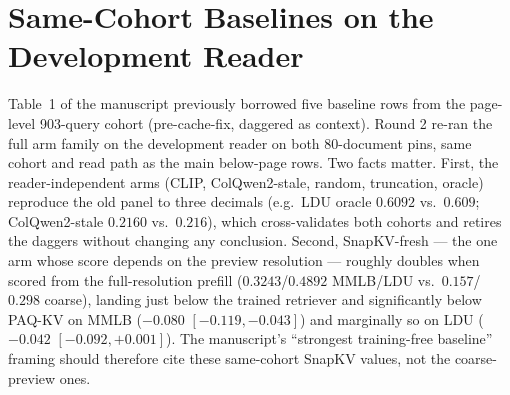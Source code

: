 \documentclass[letterpaper]{article} %
\newcommand{\paqc}{\textsc{PAQ-KV}}
\begin{document}
\begin{table}[t]
\centering\small
\setlength{\tabcolsep}{5pt}

\caption{Consolidated arm panel across all cells (accuracy at nominal $b{=}5\%$, reader Qwen3-VL-8B). LDU/MMLB baselines are the round-2 \emph{same-cohort} re-runs on the 80-document development pins (post-cache-fix, read path identical to the cached comparator rows); the reader-independent arms reproduce the earlier page-level panel to three decimals, while SnapKV-fresh is now scored from the full-resolution prefill attention (the same prefill \paqc{} uses) rather than the earlier coarse-render preview, which raises it substantially and is the fair same-cohort form. The sealed column reports the frozen sealed verdict's two arms only; its other cells are empty by design. ``--'' cells are structurally absent (arm not defined or not run for that cell). Development-grade except the sealed column.}
\label{tab:main}
\end{table}

\section{Same-Cohort Baselines on the Development Reader}\label{sec:xrb8b}

Table~1 of the manuscript previously borrowed five baseline rows from the page-level 903-query cohort (pre-cache-fix, daggered as context). Round 2 re-ran the full arm family on the development reader on both 80-document pins, same cohort and read path as the main below-page rows. Two facts matter. First, the reader-independent arms (CLIP, ColQwen2-stale, random, truncation, oracle) reproduce the old panel to three decimals (e.g.\ LDU oracle $0.6092$ vs.\ $0.609$; ColQwen2-stale $0.2160$ vs.\ $0.216$), which cross-validates both cohorts and retires the daggers without changing any conclusion. Second, SnapKV-fresh --- the one arm whose score depends on the preview resolution --- roughly doubles when scored from the full-resolution prefill ($0.3243$/$0.4892$ MMLB/LDU vs.\ $0.157$/$0.298$ coarse), landing just below the trained retriever and significantly below \paqc{} on MMLB ($-0.080$ $[-0.119,-0.043]$) and marginally so on LDU ($-0.042$ $[-0.092,+0.001]$). The manuscript's ``strongest training-free baseline'' framing should therefore cite these same-cohort SnapKV values, not the coarse-preview ones.
\end{document}
